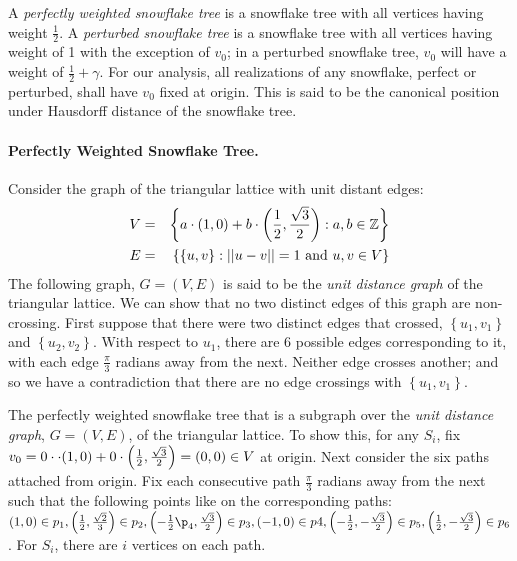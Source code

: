 A \textit{perfectly weighted snowflake tree} is a snowflake tree with all vertices having weight $\frac{1}{2}$.  A \textit{perturbed snowflake tree} is a snowflake tree with all vertices having weight of 1 with the exception of $v_0$;  in a perturbed snowflake tree, $v_0$ will have a weight of $\frac{1}{2} + \gamma$.  For our analysis, all realizations of any snowflake, perfect or perturbed, shall have $v_0$ fixed at origin.  This is said to be the canonical position under Hausdorff distance of the snowflake tree.   

\paragraph{Perfectly Weighted Snowflake Tree.}

Consider the graph of the triangular lattice with unit distant edges:
\begin{eqnarray*}
V &=& \left\lbrace a\cdot (1,0) + b \cdot \left(\frac{1}{2},\frac{\sqrt{3}}{2}\right) : a,b \in {\mathbb{Z}} \right\rbrace\\
E &=& \left\lbrace \left\lbrace u,v \right\rbrace : \vert\vert u-v \vert\vert = 1 \text{ and } u,v \in V\right\rbrace
\end{eqnarray*}
The following graph, $G=(V,E)$ is said to be the \textit{unit distance graph} of the triangular lattice.  We can show that no two distinct edges of this graph are non-crossing.  First suppose that there were two distinct edges that crossed, $\left\lbrace u_1,v_1 \right\rbrace $ and $\left\lbrace u_2,v_2 \right\rbrace$.  With respect to $u_1$, there are 6 possible edges corresponding to it, with each edge $\frac{\pi}{3}$ radians away from the next.  Neither edge crosses another; and so we have a contradiction that there are no edge crossings with $\left\lbrace u_1,v_1 \right\rbrace $.  


The perfectly weighted snowflake tree that is a subgraph over the \textit{unit distance graph}, $G=(V,E)$, of the triangular lattice.  To show this, for any $S_i$, fix $v_0 = 0 \cdot \cdot (1,0) + 0 \cdot \left(\frac{1}{2},\frac{\sqrt{3}}{2}\right)=\left( 0,0 \right) \in V$ at origin.  Next consider the six paths attached from origin.  Fix each consecutive path $\frac{\pi}{3}$ radians away from the next such that the following points like on the corresponding paths: $\lr{1,0} \in p_1, \lr{\frac{1}{2} ,\frac{\sqrt{2}}{3}} \in p_2,\lr{-\frac{1}{2}\p_4,\frac{\sqrt{3}}{2}} \in p_3, \lr{-1,0} \in p4, \lr{-\frac{1}{2},-\frac{\sqrt{3}}{2}}\in p_5,\lr{\frac{1}{2},-\frac{\sqrt{3}}{2}}\in p_6$.  For $S_i$, there are $i$ vertices on each path.  

